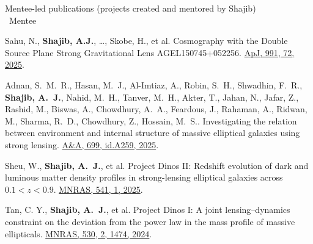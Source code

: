 \documentclass[margin, line]{res}
\begin{document}
\begin{resume}
{Mentee-led publications} (projects created and mentored by Shajib)
\\ \mentee\ Mentee
\begin{etaremune}
	\item Sahu, N.{\mentee}, \textbf{Shajib, A.J.}, \dots, Skobe, H.{\mentee}, et al. Cosmography with the Double Source Plane Strong Gravitational Lens AGEL150745+052256. \href{https://ui.adsabs.harvard.edu/abs/2025ApJ...991...72S/abstract}{ApJ, 991, 72, 2025}.
	\item Adnan, S.~M.~R.{\mentee}, Hasan, M.~J.{\mentee}, Al-Imtiaz, A.{\mentee}, Robin, S.~H.{\mentee}, Shwadhin, F.~R.{\mentee}, \textbf{Shajib, A.~J.}, Nahid, M.~H.{\mentee}, Tanver, M.~H.{\mentee}, Akter, T.{\mentee}, Jahan, N.{\mentee}, Jafar, Z.{\mentee}, Rashid, M.{\mentee}, Biswas, A.{\mentee}, Chowdhury, A.~A.{\mentee}, Feardous, J.{\mentee}, Rahaman, A.{\mentee}, Ridwan, M.{\mentee}, Sharma, R.~D.{\mentee}, Chowdhury, Z.{\mentee}, Hossain, M.~S.{\mentee}. Investigating the relation between environment and internal structure of massive elliptical galaxies using strong lensing. \href{https://ui.adsabs.harvard.edu/abs/2025A\%26A...699A.259A/abstract}{A\&A, 699, id.A259, 2025}.
	\item Sheu, W.{\mentee},  \textbf{Shajib, A.~J.}, et al. Project Dinos II: Redshift evolution of dark and luminous matter density profiles in strong-lensing elliptical galaxies across  $0.1<z<0.9$. \href{https://ui.adsabs.harvard.edu/abs/2025MNRAS.541....1S/abstract}{MNRAS, 541, 1, 2025}.
	\item Tan, C. Y.{\mentee}, \textbf{Shajib, A.~J.}, et al. Project Dinos I: A joint lensing--dynamics constraint on the deviation from the power law in the mass profile of massive ellipticals. \href{https://ui.adsabs.harvard.edu/abs/2024MNRAS.530.1474T/abstract}{MNRAS, 530, 2, 1474, 2024}.
\end{etaremune}


\end{resume}
\end{document}

